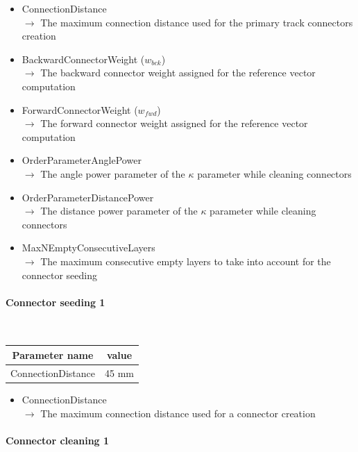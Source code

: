 \documentclass[12pt]{article}
\begin{document}
\begin{itemize}
  \item ConnectionDistance \\
  $\rightarrow$ The maximum connection distance used for the primary track connectors creation
  \item BackwardConnectorWeight ($w_{bck}$) \\
  $\rightarrow$ The backward connector weight assigned for the reference vector computation
  \item ForwardConnectorWeight ($w_{fwd}$) \\
  $\rightarrow$ The forward connector weight assigned for the reference vector computation
  \item OrderParameterAnglePower \\ 
  $\rightarrow$ The angle power parameter of the $\kappa$ parameter while cleaning connectors
  \item OrderParameterDistancePower \\
  $\rightarrow$ The distance power parameter of the $\kappa$ parameter while cleaning connectors
  \item MaxNEmptyConsecutiveLayers \\
  $\rightarrow$ The maximum consecutive empty layers to take into account for the connector seeding
\end{itemize}


\paragraph{Connector seeding 1} ~

\begin{table}[!ht]
  \begin{center}
    \begin{tabu} to \linewidth { c | c } 
          Parameter name & value \\
          \hline
          ConnectionDistance & 45 mm
    \end{tabu} 
  \end{center}
\end{table}

\begin{itemize}
  \item ConnectionDistance \\
  $\rightarrow$ The maximum connection distance used for a connector creation
\end{itemize}


\newpage
\paragraph{Connector cleaning 1} ~
\end{document}
